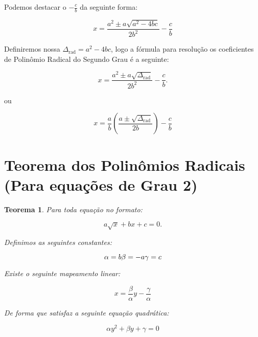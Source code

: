\documentclass{article}
\newtheorem{theorem}{Teorema}
\begin{document}
Podemos destacar o $- \frac{c}{b}$ da seguinte forma:

\[
x = \frac{a^2 \pm a\sqrt{a^2-4bc}}{2b^2}- \frac{c}{b}
\]

Definiremos nossa $\Delta_{\text{rad}}= a^2-4bc$, logo a fórmula para resolução os coeficientes de Polinômio Radical do Segundo Grau é a seguinte:

\[
x = \frac{a^2 \pm a\sqrt{\Delta_{\text{rad}}}}{2b^2}- \frac{c}{b}.
\]

ou

\[
x = \frac{a}{b}\left(\frac{a \pm \sqrt{\Delta_{\text{rad}}}}{2b}\right)- \frac{c}{b}
\]

\section{Teorema dos Polinômios Radicais (Para equações de Grau 2)}

\begin{theorem}
Para toda equação no formato:

\[
a\sqrt{x} + bx + c = 0.
\]

Definimos as seguintes constantes:

\[
\alpha = b \\
\beta = -a \\
\gamma = c
\]

Existe o seguinte mapeamento linear:

\[
x=\frac{\beta}{\alpha}y-\frac{\gamma}{\alpha}
\]

De forma que satisfaz a seguinte equação quadrática:

\[
\alpha y^2 + \beta y + \gamma = 0 
\]
\end{theorem}
\end{document}
